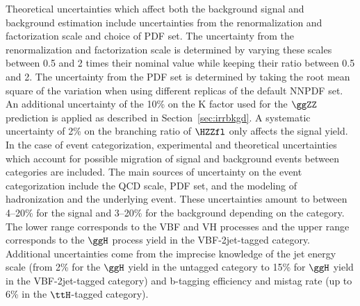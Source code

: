 Theoretical uncertainties which affect both the background signal and background estimation 
include uncertainties from the renormalization and factorization scale and choice of PDF set. 
The uncertainty from the renormalization and factorization scale is determined by varying these scales between 
0.5 and 2 times their nominal value while keeping their ratio between 0.5 and 2. 
The uncertainty from the PDF set is determined 
by taking the root mean square of the variation when using different replicas of the default NNPDF set. An additional
uncertainty of the 10\% on the K factor used for the $\ggZZ$ prediction is applied as described in Section~\ref{sec:irrbkgd}.
A systematic uncertainty of 2\% on the branching ratio of $\HZZfl$ only affects the signal yield. 
In the case of event categorization, experimental and theoretical uncertainties which account for
possible migration of signal and background events between categories are included. The main sources 
of uncertainty on the event categorization include the QCD scale, PDF set, and the modeling of hadronization and the underlying 
event. These uncertainties amount to between 4--20\% for the signal and 3--20\% for the background depending on the category.
The lower range corresponds to the VBF and VH processes and the upper range corresponds to the $\ggH$ process yield in the VBF-2jet-tagged category. 
Additional uncertainties come from the imprecise knowledge of the jet energy scale (from 2\% for the $\ggH$ yield in the untagged category to 15\% for  $\ggH$ yield in the VBF-2jet-tagged category) and b-tagging efficiency and mistag 
rate (up to 6\% in the $\ttH$-tagged category). 


